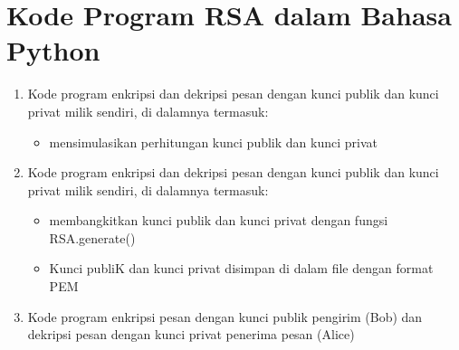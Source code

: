\documentclass{article}
\begin{document}

\section*{Kode Program RSA dalam Bahasa Python}

\begin{enumerate}
    \item Kode program enkripsi dan dekripsi pesan dengan kunci publik dan kunci privat milik sendiri, di dalamnya termasuk:
    \begin{itemize}
        \item mensimulasikan perhitungan kunci publik dan kunci privat
    \end{itemize}
    \item Kode program enkripsi dan dekripsi pesan dengan kunci publik dan kunci privat milik sendiri, di dalamnya termasuk:
    \begin{itemize}
        \item membangkitkan kunci publik dan kunci privat dengan fungsi RSA.generate()
        \item Kunci publiK dan kunci privat disimpan di dalam file dengan format PEM
    \end{itemize}
    \item Kode program enkripsi pesan dengan kunci publik pengirim (Bob) dan dekripsi pesan dengan kunci privat penerima pesan (Alice)
\end{enumerate}
\end{document}
